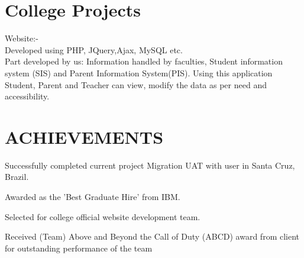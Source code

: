 \documentclass[]{deedy-resume-openfont}
\begin{document}
\begin{minipage}[t]{0.66\textwidth} 
\section{College Projects}
Website:-  \href{https://www.cucek.in}{} \\
Developed using PHP, JQuery,Ajax, MySQL etc. \\
Part developed by us: Information handled by faculties, Student information system (SIS) and Parent Information System(PIS). Using this application Student, Parent and Teacher can view, modify the data as per need and accessibility.
\sectionsep



\section{ACHIEVEMENTS}

\hfill \break
\begin{tightemize}

\item Successfully completed current project Migration UAT with user in Santa Cruz, Brazil.
\item Awarded as the 'Best Graduate Hire' from IBM. 
\item Selected for college official website development team.
\item Received  (Team) Above and Beyond the Call of Duty (ABCD) award from client for outstanding performance of the team
\end{tightemize}

\sectionsep

\end{minipage} 
\end{document}
